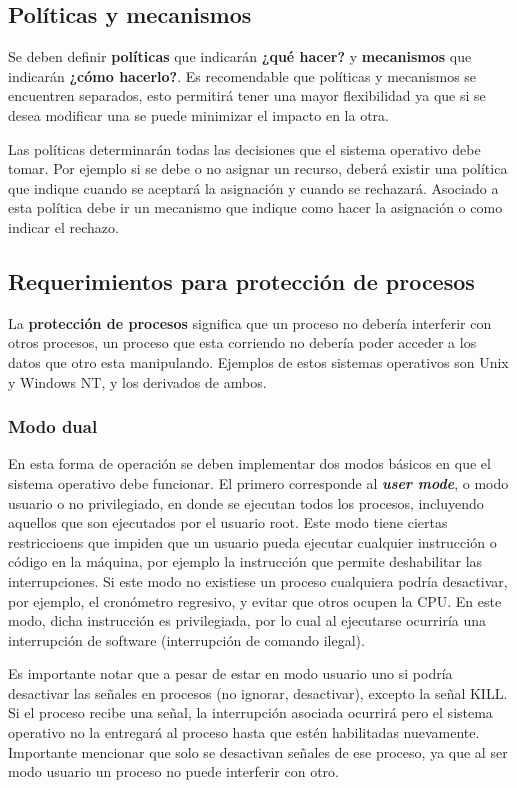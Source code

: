 \subsection{Políticas y mecanismos}
Se deben definir \textbf{políticas} que indicarán \textbf{¿qué hacer?} y
\textbf{mecanismos} que indicarán \textbf{¿cómo hacerlo?}. Es recomendable que
políticas y mecanismos se encuentren separados, esto permitirá tener una mayor
flexibilidad ya que si se desea modificar una se puede minimizar el impacto en
la otra.

Las políticas determinarán todas las decisiones que el sistema operativo debe
tomar. Por ejemplo si se debe o no asignar un recurso, deberá existir una
política que indique cuando se aceptará la asignación y cuando se rechazará.
Asociado a esta política debe ir un mecanismo que indique como hacer la
asignación o como indicar el rechazo.

\subsection{Requerimientos para protección de procesos}
La \textbf{protección de procesos} significa que un proceso no debería
interferir con otros procesos, un proceso que esta corriendo no debería poder
acceder a los datos que otro esta manipulando. Ejemplos de estos sistemas
operativos son Unix y Windows NT, y los derivados de ambos.

\subsubsection{Modo dual}
En esta forma de operación se deben implementar dos modos básicos en que el
sistema operativo debe funcionar. El primero corresponde al \textbf{\textit{user
mode}}, o modo usuario o no privilegiado, en donde se ejecutan todos los
procesos, incluyendo aquellos que son ejecutados por el usuario root. Este modo
tiene ciertas restriccioens que impiden que un usuario pueda ejecutar cualquier
instrucción o código en la máquina, por ejemplo la instrucción que permite
deshabilitar las interrupciones. Si este modo no existiese un proceso cualquiera
podría desactivar, por ejemplo, el cronómetro regresivo, y evitar que otros
ocupen la CPU. En este modo, dicha instrucción es privilegiada, por lo cual al
ejecutarse ocurriría una interrupción de software (interrupción de comando
ilegal).

Es importante notar que a pesar de estar en modo usuario uno si podría
desactivar las señales en procesos (no ignorar, desactivar), excepto la señal
KILL. Si el proceso recibe una señal, la interrupción asociada ocurrirá pero el
sistema operativo no la entregará al proceso hasta que estén habilitadas
nuevamente. Importante mencionar que solo se desactivan señales de ese proceso,
ya que al ser modo usuario un proceso no puede interferir con otro.

